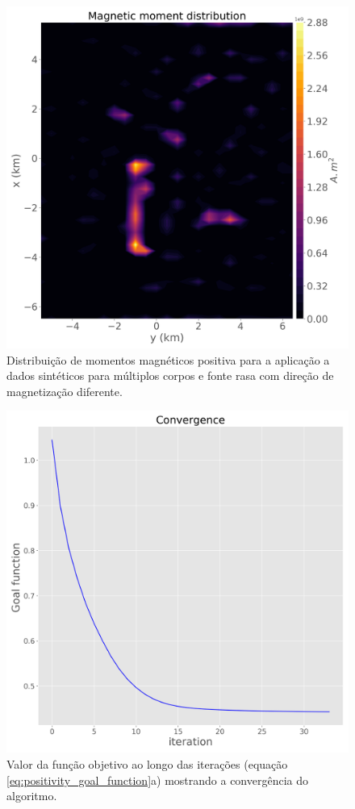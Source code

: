 \begin{figure}
	\centering
	\includegraphics[width=.9\textwidth]{Fig/eqlayer/unidir_shallow_diff_test/magnetic_moment_positive_LM_NNLS_magRM.png}
	\caption{Distribuição de momentos magnéticos positiva para a aplicação a dados sintéticos para múltiplos corpos e fonte rasa com direção de magnetização diferente.}
	\label{fig:dist_momentos_pos_3}
\end{figure}

\begin{figure}
	\centering
	\includegraphics[width=.9\textwidth]{Fig/eqlayer/unidir_shallow_diff_test/convergence_LM_NNLS_magRM.png}
	\caption{Valor da função objetivo ao longo das iterações (equação \ref{eq:positivity_goal_function}a) mostrando a convergência do algoritmo.}
	\label{fig:convergence_3}
\end{figure}

